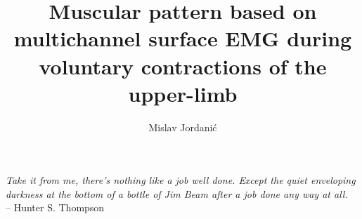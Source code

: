 \documentclass[a4paper,twoside,11pt]{report}
\begin{document}
\title{\LARGE {\bf Muscular pattern based on multichannel surface EMG during voluntary contractions of the upper-limb}\\
 \vspace*{6mm}
}

\author{Mislav Jordani\'{c}}

\normallinespacing
\maketitle

\preface{
%
%



}
%


\body{





}
%



\newpage




\appendix
\begin{appendix}



\end{appendix}

\cleardoublepage
\pagestyle{plain}
\vspace*{\fill}
\begin{myquote}
\begin{flushright}
\textit{Take it from me, there's nothing like a job well done. Except the quiet enveloping darkness at the bottom of a bottle of Jim Beam after a job done any way at all.} \\-- Hunter S. Thompson
\end{flushright}
\end{myquote}
\vspace*{\fill}
\end{document}
